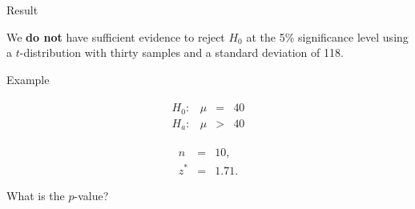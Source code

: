 
\begin{frame}{Result}

  We \textbf{do not} have sufficient evidence to reject $H_0$ at the
  5\% significance level using a $t$-distribution with thirty samples
  and a standard deviation of 118.
  
\end{frame}


\begin{frame}{Example}

  \begin{eqnarray*}
    \begin{array}{lrcl}
      H_0: & \mu & = & 40 \\
      H_a: & \mu & > & 40
    \end{array}
  \end{eqnarray*}

  \begin{eqnarray*}
    n & = & 10, \\
    z^* & = & 1.71.
  \end{eqnarray*}

  \vfill 

  What is the $p$-value?


  \vfill

  
\end{frame}


